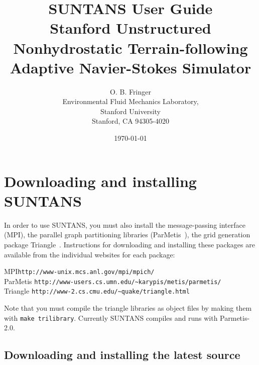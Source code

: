 \documentclass[12pt,oneside]{article}
\begin{document}

\title{SUNTANS User Guide\\
{\large Stanford Unstructured Nonhydrostatic 
Terrain-following Adaptive Navier-Stokes Simulator}}
\author{O. B. Fringer\\
\small
Environmental Fluid Mechanics Laboratory,  \\
Stanford University\\
Stanford, CA 94305-4020
\normalsize}
\date{\today}

\maketitle

\tableofcontents

\section{Downloading and installing SUNTANS}

In order to use SUNTANS, you must also install the message-passing
interface (MPI), the parallel graph partitioning libraries (ParMetis~\cite{PARMETIS[1998]}),
the grid generation package Triangle~\cite{TRIANGLE[1996]}.  Instructions for 
downloading and installing these packages are available from the individual websites
for each package:
\begin{tabbing}
MPI\hspace{0.5in}\=  \verb+http://www-unix.mcs.anl.gov/mpi/mpich/+\\
ParMetis \> \verb+http://www-users.cs.umn.edu/~karypis/metis/parmetis/+\\
Triangle \> \verb+http://www-2.cs.cmu.edu/~quake/triangle.html+
\end{tabbing}
Note that you must compile the triangle libraries as object files by making them
with \verb+make trilibrary+.  Currently SUNTANS compiles and runs with Parmetis-2.0.

\subsection{Downloading and installing the latest source} \label{sec:download}
\end{document}

